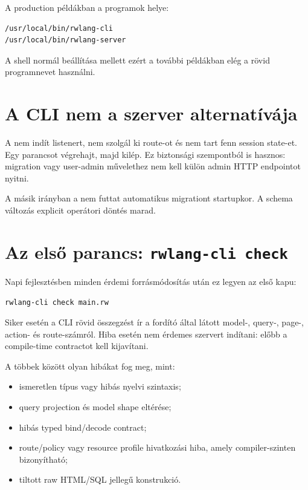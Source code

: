 A production példákban a programok helye:

\begin{lstlisting}
/usr/local/bin/rwlang-cli
/usr/local/bin/rwlang-server
\end{lstlisting}

A shell normál  beállítása mellett ezért a további példákban elég a rövid programnevet használni.

\section{A CLI nem a szerver alternatívája}

A  nem indít listenert, nem szolgál ki route-ot és nem tart fenn session state-et. Egy parancsot végrehajt, majd kilép. Ez biztonsági szempontból is hasznos: migration vagy user-admin művelethez nem kell külön admin HTTP endpointot nyitni.

A másik irányban a  nem futtat automatikus migrationt startupkor. A schema változás explicit operátori döntés marad.

\section{Az első parancs: \texttt{rwlang-cli check}}

Napi fejlesztésben minden érdemi forrásmódosítás után ez legyen az első kapu:

\begin{lstlisting}
rwlang-cli check main.rw
\end{lstlisting}

Siker esetén a CLI rövid összegzést ír a fordító által látott model-, query-, page-, action- és route-számról. Hiba esetén nem érdemes szervert indítani: előbb a compile-time contractot kell kijavítani.

A  többek között olyan hibákat fog meg, mint:

\begin{itemize}
  \item ismeretlen típus vagy hibás nyelvi szintaxis;
  \item query projection és model shape eltérése;
  \item hibás typed bind/decode contract;
  \item route/policy vagy resource profile hivatkozási hiba, amely compiler-szinten bizonyítható;
  \item tiltott raw HTML/SQL jellegű konstrukció.
\end{itemize}

